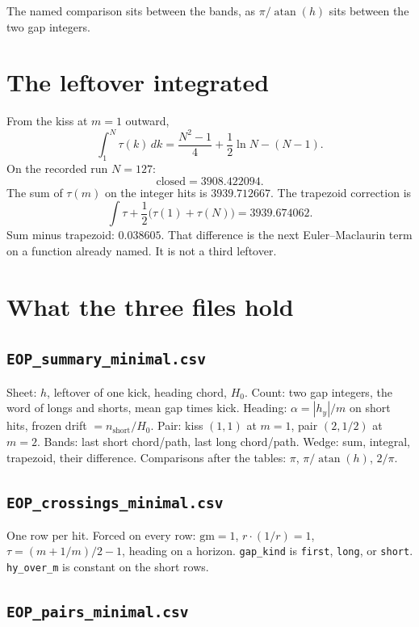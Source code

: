 \documentclass[10pt,a4paper]{article}
\theoremstyle{plain}
\theoremstyle{definition}
\theoremstyle{remark}
\begin{document}
The named comparison sits between the bands, as \(\pi/\operatorname{atan}(h)\) sits between the two gap integers.

\section{The leftover integrated}

From the kiss at \(m=1\) outward,
\[
\int_1^N\tau(k)\,dk
=\frac{N^2-1}{4}+\frac12\ln N-(N-1).
\]
On the recorded run \(N=127\):
\[
\text{closed}=3908.422094.
\]
The sum of \(\tau(m)\) on the integer hits is \(3939.712667\).
The trapezoid correction is
\[
\int\tau+\frac12\bigl(\tau(1)+\tau(N)\bigr)=3939.674062.
\]
Sum minus trapezoid: \(0.038605\).
That difference is the next Euler--Maclaurin term on a function already named.
It is not a third leftover.

\section{What the three files hold}

\subsection{\texttt{EOP\_summary\_minimal.csv}}

Sheet: \(h\), leftover of one kick, heading chord, \(H_0\).
Count: two gap integers, the word of longs and shorts, mean gap times kick.
Heading: \(\alpha=|h_y|/m\) on short hits, frozen drift \(=n_{\mathrm{short}}/H_0\).
Pair: kiss \((1,1)\) at \(m=1\), pair \((2,1/2)\) at \(m=2\).
Bands: last short chord/path, last long chord/path.
Wedge: sum, integral, trapezoid, their difference.
Comparisons after the tables: \(\pi\), \(\pi/\operatorname{atan}(h)\), \(2/\pi\).

\subsection{\texttt{EOP\_crossings\_minimal.csv}}

One row per hit.
Forced on every row: \(\mathrm{gm}=1\), \(r\cdot(1/r)=1\), \(\tau=(m+1/m)/2-1\), heading on a horizon.
\texttt{gap\_kind} is \texttt{first}, \texttt{long}, or \texttt{short}.
\texttt{hy\_over\_m} is constant on the short rows.

\subsection{\texttt{EOP\_pairs\_minimal.csv}}
\end{document}
